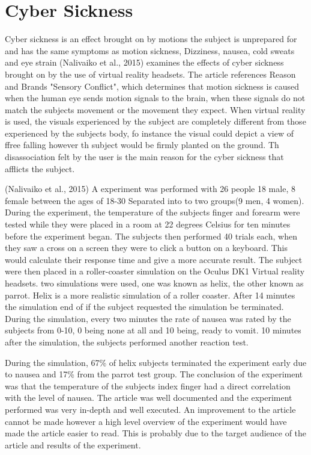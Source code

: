 \documentclass[10pt,journal,compsoc]{IEEEtran}
\begin{document}
\section{Cyber Sickness}
Cyber sickness is an effect brought on by motions the subject is unprepared for and has the same symptoms as motion sickness, Dizziness, nausea, cold sweats and eye strain (Nalivaiko et al., 2015) examines the effects of cyber sickness brought on by the use of virtual reality headsets. The article references Reason and Brands "Sensory Conflict", which determines that motion sickness is caused when the human eye sends motion signals to the brain, when these signals do not match the subjects movement or the movement they expect. When virtual reality is used, the visuals experienced by the subject are completely different from those experienced by the subjects body, fo instance the visual could depict a view of ffree falling however th subject would be firmly planted on the ground. Th disassociation felt by the user is the main reason for the cyber sickness that afflicts the subject. \newline

(Nalivaiko et al., 2015) A experiment was performed with 26 people 18 male, 8 female between the ages of 18-30 Separated into to two groups(9 men, 4 women). During the experiment, the temperature of the subjects finger and forearm were tested while they were placed in a room at 22 degrees Celsius for ten minutes before the experiment began. The subjects then performed 40 trials each, when they saw a cross on a screen they were to click a button on a keyboard. This would calculate their response time and give a more accurate result. The subject were then placed in a roller-coaster simulation on the Oculus DK1 Virtual reality headsets. two simulations were used, one was known as helix, the other known as parrot. Helix is a more realistic simulation of a roller coaster. After 14 minutes the simulation end of if the subject requested the simulation be terminated. During the simulation, every two minutes the rate of nausea was rated by the subjects from 0-10, 0 being none at all and 10 being, ready to vomit. 10 minutes after the simulation, the subjects performed another reaction test.\newline

During the simulation, 67\% of helix subjects terminated the experiment early due to nausea and 17\% from the parrot test group. The conclusion of the experiment was that the temperature of the subjects index finger had a direct correlation with the level of nausea. The article was well documented and the experiment performed was very in-depth and well executed. An improvement to the article cannot be made however a high level overview of the experiment would have made the article easier to read. This is probably due to the target audience of the article and results of the experiment.
\end{document}
